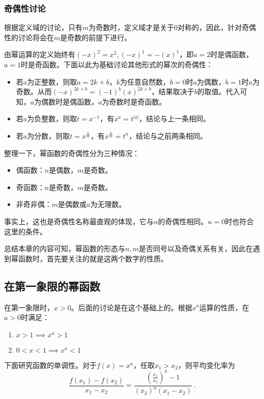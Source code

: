 \subsubsection{奇偶性讨论}

根据定义域的讨论，只有$m$为奇数时，定义域才是关于$0$对称的，因此，针对奇偶性的讨论将会在$m$是奇数的前提下进行。

由幂运算的定义始终有$(-x)^2=x^2,(-x)^1=-(x)^1$，即$a=2$时是偶函数，$a=1$时是奇函数。下面以此为基础讨论其他形式的幂次的奇偶性：

\begin{itemize}
\item 若$a$为正整数，则取$a=2k+b$，$k$为任意自然数，$b=0$时$a$为偶数，$b=1$时$a$为奇数。从而$(-x)^{2k+b}=(-1)^b(x)^{2k+b}$，结果取决于$b$的取值。代入可知，$a$为偶数时是偶函数，$a$为奇数时是奇函数。
\item 若$a$为负整数，则取$t=x^{-1}$，有$x^a=t^{|a|}$，结论与上一条相同。
\item 若$a$为分数，则取$t=x^\frac{1}{m}$，有$x^\frac{n}{m}=t^{n}$，结论与之前两条相同。
\end{itemize}

整理一下，幂函数的奇偶性分为三种情况：

\begin{itemize}
\item 偶函数：$n$是偶数，$m$是奇数。
\item 奇函数：$n$是奇数，$m$是奇数。
\item 非奇非偶：$m$是偶数或$a$为无理数。
\end{itemize}

事实上，这也是奇偶性名称最直观的体现，它与$n$的奇偶性相同。$n=0$时也符合这里的条件。

总结本章的内容可知，幂函数的形态与$n,m$是否同号以及奇偶关系有关，因此在遇到幂函数时，首先要关注的就是这两个数字的性质。

\subsection{在第一象限的幂函数}

在第一象限时，$x>0$。后面的讨论是在这个基础上的。根据$x^a$运算的性质，在$a>0$时满足：
\begin{enumerate}
\item $x>1\implies x^a>1$
\item $0<x<1\implies x^a<1$
\end{enumerate}

下面研究函数的单调性。对于$f(x)=x^a$，任取$x_1>x_2$，则平均变化率为
\begin{equation}\label{eq_power_1}
\frac{f(x_1)-f(x_2)}{x_1-x_2}=\frac{\left(\frac{x_1}{x_2}\right)^a-1}{(x_2)^a(x_1-x_2)}~.
\end{equation}

